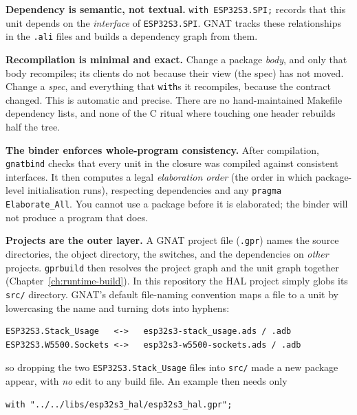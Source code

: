 \textbf{Dependency is semantic, not textual.} \texttt{with ESP32S3.SPI;} records that
this unit depends on the \emph{interface} of \texttt{ESP32S3.SPI}. GNAT tracks these
relationships in the \texttt{.ali} files and builds a dependency graph from them.

\textbf{Recompilation is minimal and exact.} Change a package \emph{body}, and only
that body recompiles; its clients do not because their view (the spec) has not
moved. Change a \emph{spec}, and everything that \texttt{with}s it recompiles,
because the contract changed. This is automatic and precise. There are no
hand-maintained Makefile dependency lists, and none of the C ritual where touching
one header rebuilds half the tree.


\textbf{The binder enforces whole-program consistency.} After compilation,
\texttt{gnatbind} checks that every unit in the closure was compiled against
consistent interfaces. It then computes a legal \emph{elaboration order} (the order
in which package-level initialisation runs), respecting dependencies and any
\texttt{pragma Elaborate\_All}. You cannot use a package before it is elaborated; the
binder will not produce a program that does.

\textbf{Projects are the outer layer.} A GNAT project file (\texttt{.gpr}) names the
source directories, the object directory, the switches, and the dependencies on
\emph{other} projects. \texttt{gprbuild} then resolves the project graph and the unit
graph together (Chapter~\ref{ch:runtime-build}). In this repository the HAL project
simply globs its \texttt{src/} directory. GNAT's default file-naming convention maps
a file to a unit by lowercasing the name and turning dots into hyphens:

\begin{lstlisting}[style=sh]
ESP32S3.Stack_Usage   <->   esp32s3-stack_usage.ads / .adb
ESP32S3.W5500.Sockets <->   esp32s3-w5500-sockets.ads / .adb
\end{lstlisting}

\noindent
so dropping the two \texttt{ESP32S3.Stack\_Usage} files into \texttt{src/} made a new
package appear, with \emph{no} edit to any build file. An example then needs only

\begin{lstlisting}[style=sh]
with "../../libs/esp32s3_hal/esp32s3_hal.gpr";
\end{lstlisting}

